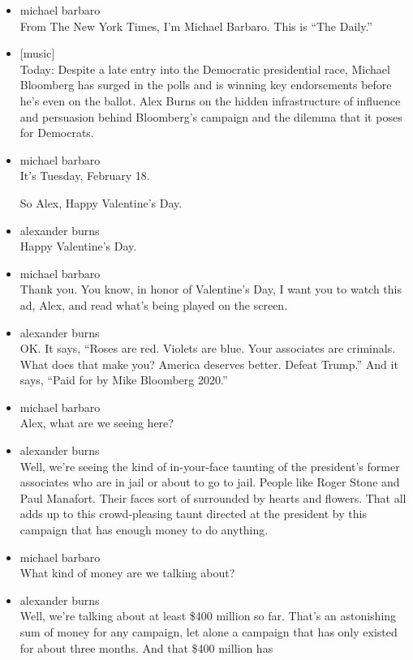 \begin{itemize}
\item
  michael barbaro\\
  From The New York Times, I'm Michael Barbaro. This is ``The Daily.''
\item
  {[}music{]}\\
  Today: Despite a late entry into the Democratic presidential race,
  Michael Bloomberg has surged in the polls and is winning key
  endorsements before he's even on the ballot. Alex Burns on the hidden
  infrastructure of influence and persuasion behind Bloomberg's campaign
  and the dilemma that it poses for Democrats.
\item
  michael barbaro\\
  It's Tuesday, February 18.

  So Alex, Happy Valentine's Day.
\item
  alexander burns\\
  Happy Valentine's Day.
\item
  michael barbaro\\
  Thank you. You know, in honor of Valentine's Day, I want you to watch
  this ad, Alex, and read what's being played on the screen.
\item
  alexander burns\\
  OK. It says, ``Roses are red. Violets are blue. Your associates are
  criminals. What does that make you? America deserves better. Defeat
  Trump.'' And it says, ``Paid for by Mike Bloomberg 2020.''
\item
  michael barbaro\\
  Alex, what are we seeing here?
\item
  alexander burns\\
  Well, we're seeing the kind of in-your-face taunting of the
  president's former associates who are in jail or about to go to jail.
  People like Roger Stone and Paul Manafort. Their faces sort of
  surrounded by hearts and flowers. That all adds up to this
  crowd-pleasing taunt directed at the president by this campaign that
  has enough money to do anything.
\item
  michael barbaro\\
  What kind of money are we talking about?
\item
  alexander burns\\
  Well, we're talking about at least \$400 million so far. That's an
  astonishing sum of money for any campaign, let alone a campaign that
  has only existed for about three months. And that \$400 million has

\end{itemize}
